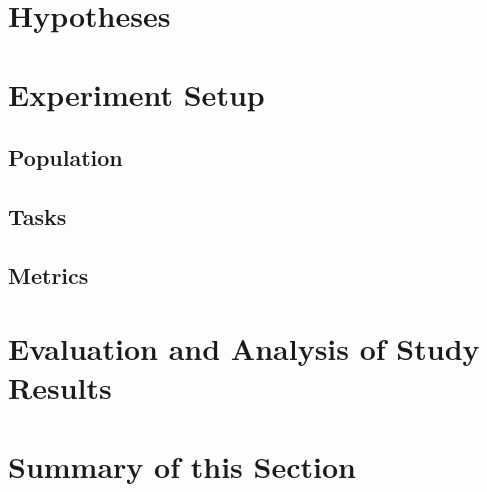 \section{Hypotheses}
\section{Experiment Setup}
\subsection{Population}
\subsection{Tasks}
\subsection{Metrics}
\section{Evaluation and Analysis of Study Results}

\section{Summary of this Section}